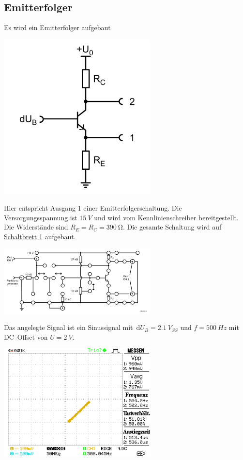 \documentclass[10pt]{article}
\newcommand{\td}{\,\text{d}}
\newenvironment{Figure}
  {\par\medskip\noindent\minipage{\linewidth}}
  {\endminipage\par\medskip}
\begin{document}
\begin{multicols}{2}
	\subsection{Emitterfolger}
	Es wird ein Emitterfolger aufgebaut
	\begin{Figure}
		\centering
		\includegraphics[width=0.6\textwidth]{emitterfolger.png}
	\end{Figure}
	Hier entspricht Ausgang 1 einer Emitterfolgerschaltung.
	Die Versorgungsspannung ist $\SI{15}{V}$ und wird vom Kennlinienschreiber bereitgestellt.
	Die Widerstände sind $R_E=R_C=\SI{390}{\ohm}$.
	Die gesamte Schaltung wird auf \hyperref[fig:schaltbrett_1]{Schaltbrett 1} aufgebaut.
	\begin{Figure}
		\centering
		\includegraphics[width=0.6\textwidth]{schaltbrett_1.png}
		 \label{fig:schaltbrett_1}
	\end{Figure}
	Das angelegte Signal ist ein Sinussignal mit $\td U_B=\SI{2.1}{V_{SS}}$ und $f=\SI{500}{Hz}$ mit DC--Offset von $U=\SI{2}{V}$.
	\begin{Figure}
		\centering
		\includegraphics[width=0.6\textwidth]{../data/DS0003.png}

\end{Figure}
\end{multicols}
\end{document}
